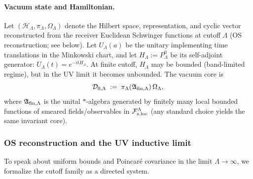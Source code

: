 \documentclass[10pt]{article}
\theoremstyle{definition}
\theoremstyle{plain}
\begin{document}
\paragraph{Vacuum state and Hamiltonian.}
Let $(\mathcal H_\Lambda,\pi_\Lambda,\Omega_\Lambda)$ denote the Hilbert space, representation, and
cyclic vector reconstructed from the receiver Euclidean Schwinger functions at cutoff $\Lambda$
(OS reconstruction; see below).  Let $U_\Lambda(a)$ be the unitary implementing time translations
in the Minkowski chart, and let $H_\Lambda:=P^0_\Lambda$ be its self-adjoint generator:
$U_\Lambda(t)=e^{-itH_\Lambda}$.  At finite cutoff, $H_\Lambda$ may be bounded (band-limited regime),
but in the UV limit it becomes unbounded.  The vacuum core is
\[
\mathcal D_{0,\Lambda}\;:=\;\pi_\Lambda(\mathfrak A_{{\rm fin},\Lambda})\,\Omega_\Lambda,
\]
where $\mathfrak A_{{\rm fin},\Lambda}$ is the unital $*$-algebra generated by finitely many local
bounded functions of smeared fields/observables in $\mathcal F_{\rm s.loc}^\Lambda$ (any standard choice
yields the same invariant core).


\subsubsection*{OS reconstruction and the UV inductive limit}

To speak about uniform bounds and Poincar\'e covariance in the limit $\Lambda\to\infty$, we
formalize the cutoff family as a directed system.
\end{document}
